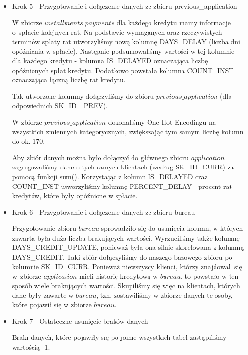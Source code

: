 \documentclass[12pt]{article}
\begin{document}
\begin {itemize}
Do wszystkich zmiennych kategorycznych zastosowaliśmy One Hot Encoding.

\item {Krok 5 - Przygotowanie i dołączenie danych ze zbioru previous\_application}

W zbiorze $installments\_payments$ dla każdego kredytu mamy informacje o~spłacie kolejnych rat. Na podstawie wymaganych oraz rzeczywistych terminów spłaty rat utworzyliśmy nową kolumnę DAYS\_DELAY (liczba dni opóźnienia w spłacie). Następnie podsumowaliśmy wartości w tej kolumnie dla każdego kredytu - kolumna IS\_DELAYED oznaczająca liczbę opóźnionych spłat kredytu. Dodatkowo powstała kolumna COUNT\_INST oznaczająca łączną liczbę rat kredytu. 

Tak utworzone kolumny dołączyliśmy do zbioru $previous\_application$ (dla odpowiednich SK\_ID\_ PREV). 

W zbiorze $previous\_application$ dokonaliśmy One Hot Encodingu na wszystkich zmiennych kategorycznych, zwiększając tym samym liczbę kolumn do ok. 170.

Aby zbiór danych można było dołączyć do głównego zbioru $application$ zagregowaliśmy dane o tych samych klientach (według SK\_ID\_CURR) za pomocą funkcji sum(). Korzystając z kolumn IS\_DELAYED oraz COUNT\_INST utworzyliśmy kolumnę PERCENT\_DELAY - procent rat kredytów, które były opóźnione w spłacie.

\item {Krok 6 - Przygotowanie i dołączenie danych ze zbioru bureau}

Przygotowanie zbioru $bureau$ sprowadziło się do usunięcia kolumn, w których zawarta była duża liczba brakujących wartości. Wyrzuciliśmy także kolumnę DAYS\_CREDIT\_UPDATE, ponieważ była ona silnie skorelowana z kolumną DAYS\_CREDIT. Taki zbiór dołączyliśmy do naszego bazowego zbioru po kolumnie SK\_ID\_CURR. Ponieważ niewszyscy klienci, którzy znajdowali się w~zbiorze $application$ mieli historię kredytową w $bureau$, to powstało w ten sposób wiele brakujących wartości. Skupiliśmy się więc na klientach, których dane były zawarte w $bureau$, tzn. zostawiliśmy w zbiorze danych te osoby, które pojawił się w zbiorze $bureau$.

\item {Krok 7 - Ostateczne usunięcie braków danych}

Braki danych, które pojawiły się po joinie wszystkich tabel zastąpiliśmy wartością -1.

\end{itemize}
\end{document}
